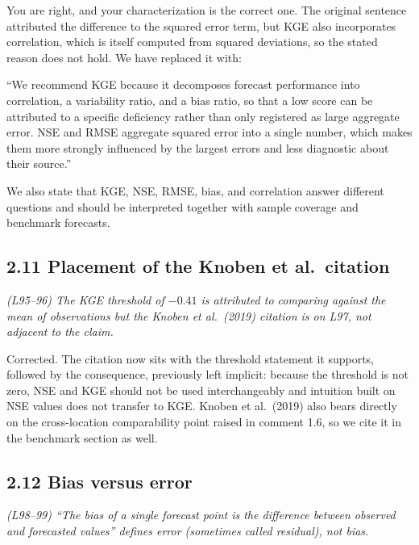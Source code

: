 \documentclass[11pt]{article}
\newenvironment{rc}%
  {\begin{list}{}{\setlength{\leftmargin}{1.5em}\setlength{\rightmargin}{1.5em}%
   \setlength{\topsep}{0.2em}\setlength{\parsep}{0pt}\setlength{\itemsep}{0pt}}%
   \item[]\itshape\color{quotegray}}%
  {\end{list}}
\newenvironment{newtext}%
  {\begin{list}{}{\setlength{\leftmargin}{1.5em}\setlength{\rightmargin}{1.5em}%
   \setlength{\topsep}{0.2em}\setlength{\parsep}{0pt}\setlength{\itemsep}{0pt}}%
   \item[]}%
  {\end{list}}
\begin{document}
You are right, and your characterization is the correct one. The original sentence attributed
the difference to the squared error term, but KGE also incorporates correlation, which is
itself computed from squared deviations, so the stated reason does not hold. We have replaced
it with:

\begin{newtext}
``We recommend KGE because it decomposes forecast performance into correlation, a variability
ratio, and a bias ratio, so that a low score can be attributed to a specific deficiency
rather than only registered as large aggregate error. NSE and RMSE aggregate squared error
into a single number, which makes them more strongly influenced by the largest errors and
less diagnostic about their source.''
\end{newtext}

We also state that KGE, NSE, RMSE, bias, and correlation answer different questions and should
be interpreted together with sample coverage and benchmark forecasts.

\subsection*{2.11 Placement of the Knoben et al.\ citation}

\begin{rc}
(L95--96) The KGE threshold of $-0.41$ is attributed to comparing against the mean of
observations but the Knoben et al.\ (2019) citation is on L97, not adjacent to the claim.
\end{rc}

Corrected. The citation now sits with the threshold statement it supports, followed by the
consequence, previously left implicit: because the threshold is not zero, NSE and KGE should not be
used interchangeably and intuition built on NSE values does not transfer to KGE. Knoben et al.\
(2019) also bears directly on the cross-location comparability point raised in comment 1.6, so we
cite it in the benchmark section as well.

\subsection*{2.12 Bias versus error}

\begin{rc}
(L98--99) ``The bias of a single forecast point is the difference between observed and
forecasted values'' defines error (sometimes called residual), not bias.
\end{rc}
\end{document}
